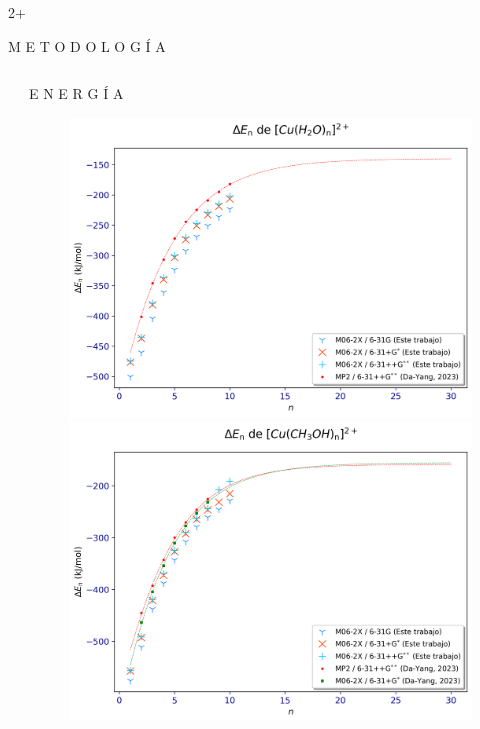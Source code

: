 \documentclass[final]{beamer}
\newlength{\sepwidth}
\newlength{\colwidth}
\newcommand{\separatorcolumn}{\begin{column}{\sepwidth}\end{column}}
\begin{document}
\begin{frame}[t]
\begin{columns}[t]
\begin{column}{2\colwidth+\sepwidth}
\begin{exampleblock}{M E T O D O L O G Í A}{}

			\end{exampleblock}		

		\end{column}

	\end{columns}

	\begin{columns}[t]

		\separatorcolumn
		
		\begin{column}{\colwidth}
			
			\begin{block}{E N E R G Í A}{}

				\begin{figure}[H]
					\centering
					\begin{minipage}[b]{0.48\textwidth}
						\centering
						\includegraphics[width=\textwidth]{logos/bases_agua.png}
					\end{minipage}%
					\hfill
					\begin{minipage}[b]{0.48\textwidth}
						\centering
						\includegraphics[width=\textwidth]{logos/bases_metanol.png}

\end{minipage}
\end{figure}
\end{block}
\end{column}
\end{columns}
\end{frame}
\end{document}
